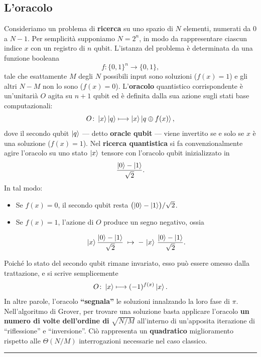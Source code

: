 \documentclass[a4paper,12pt]{report}
\theoremstyle{plain}
\begin{document}
\subsection{L'oracolo}
Consideriamo un problema di \textbf{ricerca} su uno spazio di $N$ elementi, numerati da $0$ a $N-1$. Per semplicità supponiamo $N=2^n$, in modo da rappresentare ciascun indice $x$ con un registro di $n$ qubit. L'istanza del problema è determinata da una funzione booleana
\[
f\colon\{0,1\}^n \to \{0,1\},
\]
tale che esattamente $M$ degli $N$ possibili input sono soluzioni ($f(x)=1$) e gli altri $N-M$ non lo sono ($f(x)=0$). L'\textbf{oracolo} quantistico corrispondente è un'unitarià $O$ agita su $n+1$ qubit ed è definita dalla sua azione sugli stati base computazionali:
\begin{equation}
O\colon \ket{x}\ket{q} \longmapsto \ket{x}\ket{q \oplus f(x)},
\end{equation}
dove il secondo qubit $\ket{q}$ --- detto \textbf{oracle qubit} --- viene invertito se e solo se $x$ è una soluzione ($f(x)=1$).
Nel \textbf{ricerca quantistica} si fa convenzionalmente agire l'oracolo su uno stato $\ket{x}$ tensore con l'oracolo qubit inizializzato in
\[
\frac{\ket{0} - \ket{1}}{\sqrt{2}}.
\]
In tal modo:
\begin{itemize}
    \item Se $f(x)=0$, il secondo qubit resta $\bigl(\ket{0} - \ket{1}\bigr)/\sqrt{2}$.
    \item Se $f(x)=1$, l'azione di $O$ produce un segno negativo, ossia
    
    \[
      \ket{x} \frac{\ket{0} - \ket{1}}{\sqrt{2}}
      \;\mapsto\;
      -\,\ket{x}\,\frac{\ket{0} - \ket{1}}{\sqrt{2}}.
    \]
\end{itemize}
Poiché lo stato del secondo qubit rimane invariato, esso può essere omesso dalla trattazione, e si scrive semplicemente
\begin{equation}
O\colon \ket{x} \longmapsto (-1)^{f(x)}\ket{x}.
\end{equation}
In altre parole, l'oracolo \textbf{``segnala''} le soluzioni innalzando la loro fase di $\pi$.
Nell'algoritmo di Grover, per trovare una soluzione basta applicare l'oracolo \textbf{un numero di volte dell'ordine di} $\sqrt{N/M}$ all'interno di un'apposita iterazione di ``riflessione'' e ``inversione''. Ciò rappresenta un \textbf{quadratico} miglioramento rispetto alle $\Theta(N/M)$ interrogazioni necessarie nel caso classico.
\vspace{0.5em}\hrule\vspace{0.5em}
\end{document}

